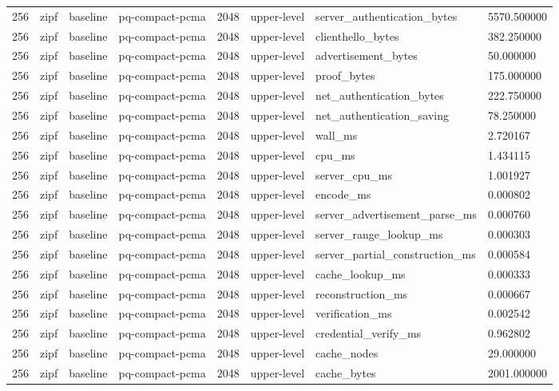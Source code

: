 \begin{tabular}{llllllll}
256 & zipf & baseline & pq-compact-pcma & 2048 & upper-level & server\_authentication\_bytes & 5570.500000 \\
256 & zipf & baseline & pq-compact-pcma & 2048 & upper-level & clienthello\_bytes & 382.250000 \\
256 & zipf & baseline & pq-compact-pcma & 2048 & upper-level & advertisement\_bytes & 50.000000 \\
256 & zipf & baseline & pq-compact-pcma & 2048 & upper-level & proof\_bytes & 175.000000 \\
256 & zipf & baseline & pq-compact-pcma & 2048 & upper-level & net\_authentication\_bytes & 222.750000 \\
256 & zipf & baseline & pq-compact-pcma & 2048 & upper-level & net\_authentication\_saving & 78.250000 \\
256 & zipf & baseline & pq-compact-pcma & 2048 & upper-level & wall\_ms & 2.720167 \\
256 & zipf & baseline & pq-compact-pcma & 2048 & upper-level & cpu\_ms & 1.434115 \\
256 & zipf & baseline & pq-compact-pcma & 2048 & upper-level & server\_cpu\_ms & 1.001927 \\
256 & zipf & baseline & pq-compact-pcma & 2048 & upper-level & encode\_ms & 0.000802 \\
256 & zipf & baseline & pq-compact-pcma & 2048 & upper-level & server\_advertisement\_parse\_ms & 0.000760 \\
256 & zipf & baseline & pq-compact-pcma & 2048 & upper-level & server\_range\_lookup\_ms & 0.000303 \\
256 & zipf & baseline & pq-compact-pcma & 2048 & upper-level & server\_partial\_construction\_ms & 0.000584 \\
256 & zipf & baseline & pq-compact-pcma & 2048 & upper-level & cache\_lookup\_ms & 0.000333 \\
256 & zipf & baseline & pq-compact-pcma & 2048 & upper-level & reconstruction\_ms & 0.000667 \\
256 & zipf & baseline & pq-compact-pcma & 2048 & upper-level & verification\_ms & 0.002542 \\
256 & zipf & baseline & pq-compact-pcma & 2048 & upper-level & credential\_verify\_ms & 0.962802 \\
256 & zipf & baseline & pq-compact-pcma & 2048 & upper-level & cache\_nodes & 29.000000 \\
256 & zipf & baseline & pq-compact-pcma & 2048 & upper-level & cache\_bytes & 2001.000000 \\

\end{tabular}
